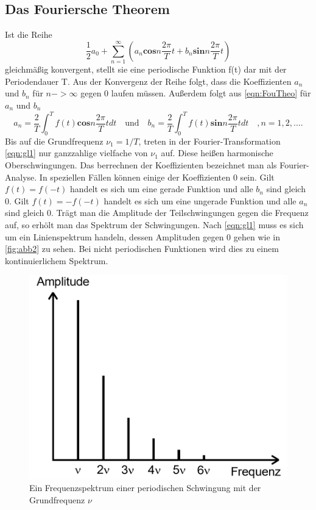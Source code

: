\subsection{Das Fouriersche Theorem}
\label{sec:Fouriersche Theorem}
Ist die Reihe
\begin{equation}
  \frac{1}{2} a_0 + \sum_{n = 1}^{\infty} \left( a_n \symbf{cos} n \frac{2 \pi}{T} t + b_n \symbf{sin} n \frac{2 \pi}{T} t \right) 
  \label{eqn:gl1}
\end{equation}
gleichmäßig konvergent, stellt sie eine periodische Funktion f(t) dar mit der Periodendauer T.
Aus der Konvergenz der Reihe folgt, dass die Koeffizienten $a_n$ und $b_n$ für $n -> \infty$ gegen 0 laufen müssen.
Außerdem folgt aus \ref{eqn:FouTheo} für $a_n$ und $b_n$
\begin{equation}
  a_n = \frac{2}{T} \int_0^T f(t) \symbf{cos} n \frac{2 \pi}{T} t dt \quad
  \textrm{und} \quad
  b_n = \frac{2}{T} \int_0^T f(t) \symbf{sin} n \frac{2 \pi}{T} t dt \quad
  ,n= 1, 2, .... 
  \label{eqn:gl2}
\end{equation}
Bis auf die Grundfrequenz $\nu_1 = 1/T$, treten in der Fourier-Transformation \ref{eqn:gl1} nur ganzzahlige vielfache von $\nu_1$ auf.
Diese heißen harmonische Oberschwingungen.
Das berrechnen der Koeffizienten bezeichnet man als Fourier-Analyse.
In speziellen Fällen können einige der Koeffizienten 0 sein. 
Gilt $f(t) = f(-t)$ handelt es sich um eine gerade Funktion und alle $b_n$ sind gleich 0.
Gilt $f(t) = -f(-t)$ handelt es sich um eine ungerade Funktion und alle $a_n$ sind gleich 0.
Trägt man die Amplitude der Teilschwingungen gegen die Frequenz auf, so erhölt man das Spektrum der Schwingungen.
Nach \ref{eqn:gl1} muss es sich um ein Linienspektrum handeln, dessen Amplituden gegen 0 gehen wie in \ref{fig:abb2} zu sehen.
Bei nicht periodischen Funktionen wird dies zu einem kontinuierlichem Spektrum.
\begin{figure}
  \centering
  \includegraphics[width=\textwidth]{abb1.jpg}
  \caption{Ein Frequenzspektrum einer periodischen Schwingung mit der Grundfrequenz $\nu$}
  \label{fig:abb1}
\end{figure}

